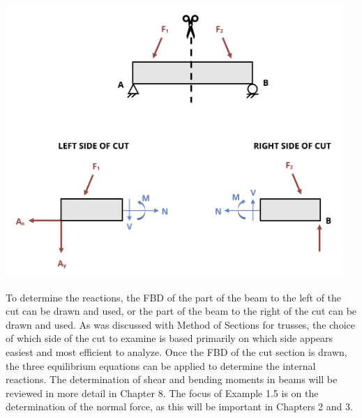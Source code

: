 \documentclass[
  letterpaper,
  DIV=11,
  numbers=noendperiod]{scrreprt}
\begin{document}
\begin{center}
\includegraphics[width=5.03125in,height=\textheight]{images/CH1 PNGs/figure 1.2.png}
\end{center}

To determine the reactions, the FBD of the part of the beam to the left
of the cut can be drawn and used, or the part of the beam to the right
of the cut can be drawn and used. As was discussed with Method of
Sections for trusses, the choice of which side of the cut to examine is
based primarily on which side appears easiest and most efficient to
analyze. Once the FBD of the cut section is drawn, the three equilibrium
equations can be applied to determine the internal reactions. The
determination of shear and bending moments in beams will be reviewed in
more detail in Chapter 8. The focus of Example 1.5 is on the
determination of the normal force, as this will be important in Chapters
2 and 3.
\end{document}

